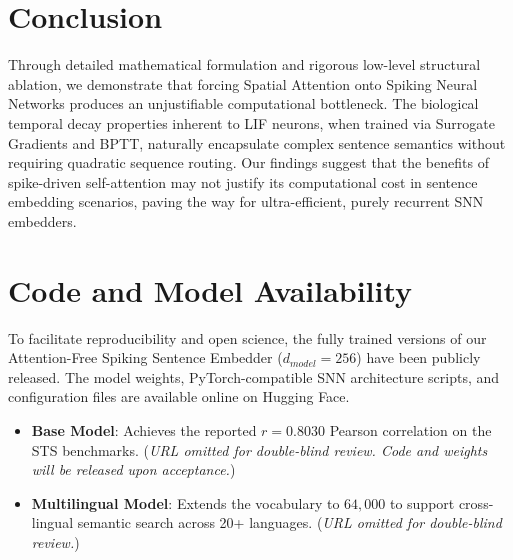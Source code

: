 \documentclass[preprint,12pt]{elsarticle}
\begin{document}
\section{Conclusion}
Through detailed mathematical formulation and rigorous low-level structural ablation, we demonstrate that forcing Spatial Attention onto Spiking Neural Networks produces an unjustifiable computational bottleneck. The biological temporal decay properties inherent to LIF neurons, when trained via Surrogate Gradients and BPTT, naturally encapsulate complex sentence semantics without requiring quadratic sequence routing. Our findings suggest that the benefits of spike-driven self-attention may not justify its computational cost in sentence embedding scenarios, paving the way for ultra-efficient, purely recurrent SNN embedders.


\section{Code and Model Availability}
To facilitate reproducibility and open science, the fully trained versions of our Attention-Free Spiking Sentence Embedder ($d_{model} = 256$) have been publicly released. The model weights, PyTorch-compatible SNN architecture scripts, and configuration files are available online on Hugging Face.
\begin{itemize}
    \item \textbf{Base Model}: Achieves the reported $r = 0.8030$ Pearson correlation on the STS benchmarks. (\textit{URL omitted for double-blind review. Code and weights will be released upon acceptance.})
    \item \textbf{Multilingual Model}: Extends the vocabulary to $64,000$ to support cross-lingual semantic search across 20+ languages. (\textit{URL omitted for double-blind review.})
\end{itemize}



\end{document}
